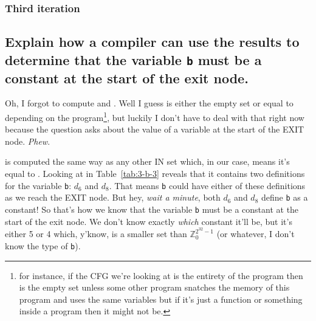 

\subsubsection{Third iteration}
\renewcommand{\INBone}		{$\{d_4,~ d_6,~ d_7,~ d_8,~ d_9,~ d_{10},~ d_{12}\}$}
\renewcommand{\OUTBone}		{$\{d_1,~ d_2,~ d_3,~ d_4,~ d_7,~ d_9\}$}




\subsection{Explain how a compiler can use the results to determine that the variable \texttt{b} must be a constant at the start of the exit node.}
Oh, I forgot to compute  and .
Well I guess  is either the empty set or equal to  depending on the program\footnote{for instance, if the CFG we're looking at is the entirety of the program then  is the empty set unless some other program snatches the memory of this program and uses the same variables but if it's just a function or something inside a program then it might not be.}, but luckily I don't have to deal with that right now because the question asks about the value of a variable at the start of the EXIT node. \emph{Phew}.

 is computed the same way as any other IN set which, in our case, means it's equal to .
Looking at  in Table~\ref{tab:3-b-3} reveals that it contains two definitions for the variable \texttt{b}: $d_6$ and $d_8$.
That means \texttt{b} could have either of these definitions as we reach the EXIT node.
But hey, \emph{wait a minute}, both $d_6$ and $d_8$ define \texttt{b} as a constant!
So that's how we know that the variable \texttt{b} must be a constant at the start of the exit node.
We don't know exactly \emph{which} constant it'll be, but it's either 5 or 4 which, y'know, is a smaller set than $\mathbb{Z}_{0}^{2^{32}-1}$ (or whatever, I don't know the type of \texttt{b}).
